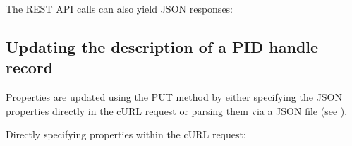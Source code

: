 \documentclass[a4paper,10pt,english]{sphinxmanual}
\begin{document}
\sphinxAtStartPar
{}

\sphinxAtStartPar
The REST API calls can also yield JSON responses:

\sphinxAtStartPar
{}


\subsection{Updating the description of a PID handle record}
\label{\detokenize{epic-cookbook/handles:updating-the-description-of-a-pid-handle-record}}
\sphinxAtStartPar
Properties are updated using the PUT method by either specifying the
JSON properties directly in the cURL request or parsing them via a
JSON file (see ).

\sphinxAtStartPar
Directly specifying properties within the cURL request:
\end{document}
